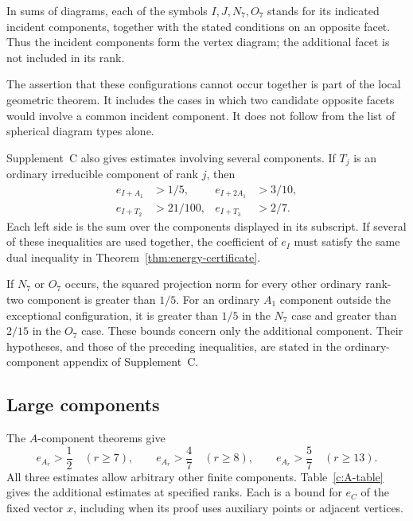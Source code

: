 \documentclass[11pt]{article}
\theoremstyle{definition}
\theoremstyle{remark}
\numberwithin{equation}{section}
\begin{document}
In sums of diagrams, each of the symbols $I,J,N_7,O_7$ stands for
its indicated incident components, together with the stated conditions
on an opposite facet. Thus the incident components form the vertex
diagram; the additional facet is not included in its rank.

The assertion that these configurations cannot occur together is part
of the local geometric theorem. It includes the cases in which two
candidate opposite facets would involve a common incident component.
It does not follow from the list of spherical diagram types alone.

Supplement~C also gives estimates involving several components.
If $T_j$ is an ordinary irreducible component of rank $j$, then
\begin{align}
 e_{I+A_1}&>1/5,&
 e_{I+2A_1}&>3/10,\label{c:I-joint-one}\\
 e_{I+T_2}&>21/100,&
 e_{I+T_3}&>2/7.\label{c:I-joint-two}
\end{align}
Each left side is the sum over the components displayed in its
subscript. If several of these inequalities are used together, the
coefficient of $e_I$ must satisfy the same dual inequality in
Theorem~\ref{thm:energy-certificate}.

If $N_7$ or $O_7$ occurs, the squared projection norm for every
other ordinary rank-two component is greater than $1/5$. For an
ordinary $A_1$ component outside the exceptional configuration, it
is greater than $1/5$ in the $N_7$ case and greater than $2/15$ in
the $O_7$ case.
These bounds concern only the additional component. Their hypotheses,
and those of the preceding inequalities, are stated in the
ordinary-component appendix of Supplement~C.

\subsection{Large components}
\label{c:large}

The $A$-component theorems give
\begin{equation}\label{c:A-thresholds}
 e_{A_r}>\frac12\quad(r\ge7),\qquad
 e_{A_r}>\frac47\quad(r\ge8),\qquad
 e_{A_r}>\frac57\quad(r\ge13).
\end{equation}
All three estimates allow arbitrary other finite components.
Table~\ref{c:A-table} gives the additional estimates at specified
ranks. Each is a bound for $e_C$ of the fixed vector $x$, including
when its proof uses auxiliary points or adjacent vertices.
\end{document}
